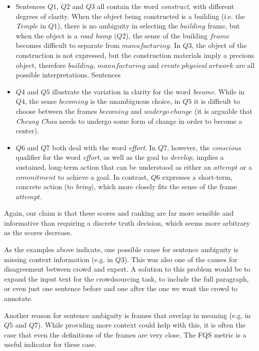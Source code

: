 \begin{itemize}

\item Sentences $Q1$, $Q2$ and $Q3$ all contain the word \textit{construct}, with different degrees of clarity. When the object being constructed is a building (i.e. the \textit{Temple} in $Q1$), there is no ambiguity in selecting the $building$ frame, but when the object is a \textit{road bump} ($Q2$), the sense of the building $frame$ becomes difficult to separate from $manufacturing$. In $Q3$, the object of the construction is not expressed, but the construction materials imply a precious object, therefore $building$, $manufacturing$ and $create\ physical\ artwork$ are all possible interpretations. Sentences 

\item $Q4$ and $Q5$ illustrate the variation in clarity for the word \textit{become}. While in $Q4$, the sense $becoming$ is the unambiguous choice, in $Q5$ it is difficult to choose between the frames $becoming$ and $undergo\ change$ (it is arguable that \textit{Cheung Chau} needs to undergo some form of change in order to become a center).

\item $Q6$ and $Q7$ both deal with the word \textit{effort}. In $Q7$, however, the \textit{conscious} qualifier for the word \textit{effort}, as well as the goal to \textit{develop}, implies a sustained, long-term action that can be understood as either an $attempt$ or a $commitment$ to achieve a goal. In contrast, $Q6$ expresses a short-term, concrete action (to \textit{bring}), which more closely fits the sense of the frame $attempt$.

\end{itemize}

Again, our claim is that these scores and ranking are far more sensible and informative than requiring a discrete truth decision, which seems more arbitrary as the scores decrease.

As the examples above indicate, one possible cause for sentence ambiguity is missing context information (e.g. in $Q3$). This was also one of the causes for disagreement between crowd and expert. A solution to this problem would be to expand the input text for the crowdsourcing task, to include the full paragraph, or even just one sentence before and one after the one we want the crowd to annotate.

Another reason for sentence ambiguity is frames that overlap in meaning (e.g. in $Q5$ and $Q7$). While providing more context could help with this, it is often the case that even the definitions of the frames are very close. The FQS metric is a useful indicator for these case.

